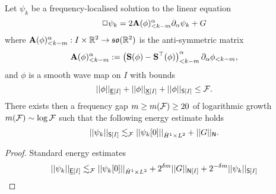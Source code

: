 	
\begin{proposition}
	Let $\psi_k$ be a frequency-localised solution to the linear equation 
		\begin{equation}
			\Box \psi_k = 2 {\bf A} (\phi)_{< k - m}^\alpha \partial_\alpha \psi_k + G
			\label{eq:linwave}
		\end{equation} 
	where ${\bf A}(\phi)_{< k - m}^\alpha : I \times \mathbb R^2 \to \mathfrak{so} (\mathbb R^2)$ is the anti-symmetric matrix 
		\[
			{\bf A}(\phi)_{< k - m}^\alpha := \left({\bf S}(\phi) - {\bf S}^\top (\phi)\right)_{< k - m}^\alpha \partial_\alpha \phi_{< k - m},
		\]
	and $\phi$ is a smooth wave map on $I$ with bounds 
		\begin{equation}
			||\phi||_{\underline{\mathsf E} [I]} + ||\phi||_{\underline{\mathsf X} [I]} + ||\phi||_{\mathsf S [I]} \leq \mathcal F.
		\end{equation}
	There exists then a frequency gap $m \geq m(\mathcal F) \geq 20$ of logarithmic growth $m(\mathcal F) \sim \log \mathcal F$ such that the following energy estimate holds
		\begin{equation}
			||\psi_k||_{\mathsf S[I]}
				\lesssim_\mathcal F ||\psi_k [0]||_{\dot H^1 \times L^2} + ||G||_{\mathsf N}.\label{eq:renormest}
		\end{equation}	
\end{proposition}

\begin{proof}
	Standard energy estimates
		\begin{equation}
			||\psi_k||_{\underline{\mathsf E}[I]} \lesssim_\mathcal F ||\psi_k [0]||_{\dot H^1 \times L^2} + 2^{\delta m} || G||_{\mathsf N [I]} + 2^{-\delta m} || \psi_k||_{\mathsf S[I]}
		\end{equation}
	
\end{proof}